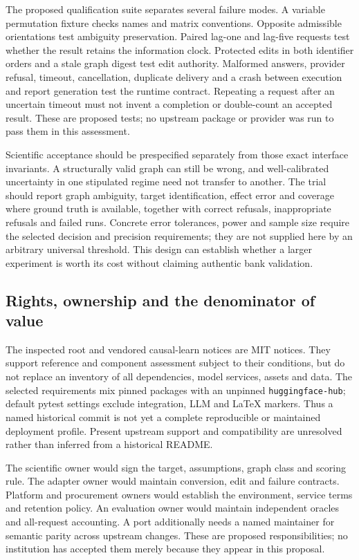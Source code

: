 The proposed qualification suite separates several failure modes. A variable
permutation fixture checks names and matrix conventions. Opposite admissible
orientations test ambiguity preservation. Paired lag-one and lag-five
requests test whether the result retains the information clock. Protected
edits in both identifier orders and a stale graph digest test edit authority.
Malformed answers, provider refusal, timeout, cancellation, duplicate delivery
and a crash between execution and report generation test the runtime
contract. Repeating a request after an uncertain timeout must not invent a
completion or double-count an accepted result. These are proposed tests; no
upstream package or provider was run to pass them in this assessment.
\citep{exec25_copilot_choice}

Scientific acceptance should be prespecified separately from those exact
interface invariants. A structurally valid graph can still be wrong, and
well-calibrated uncertainty in one stipulated regime need not transfer to
another. The trial should report graph ambiguity, target identification,
effect error and coverage where ground truth is available, together with
correct refusals, inappropriate refusals and failed runs. Concrete error
tolerances, power and sample size require the selected decision and precision
requirements; they are not supplied here by an arbitrary universal threshold.
This design can establish whether a larger experiment is worth its cost
without claiming authentic bank validation.~\citep{exec25_copilot_choice}

\subsection{Rights, ownership and the denominator of value}

The inspected root and vendored causal-learn notices are MIT notices. They
support reference and component assessment subject to their conditions, but
do not replace an inventory of all dependencies, model services, assets and
data. The selected requirements mix pinned packages with an unpinned
\texttt{huggingface-hub}; default pytest settings exclude integration, LLM
and LaTeX markers. Thus a named historical commit is not yet a complete
reproducible or maintained deployment profile. Present upstream support and
compatibility are unresolved rather than inferred from a historical README.
\citep{exec17_copilot_code,exec17_copilot_rights}

The scientific owner would sign the target, assumptions, graph class and
scoring rule. The adapter owner would maintain conversion, edit and failure
contracts. Platform and procurement owners would establish the environment,
service terms and retention policy. An evaluation owner would maintain
independent oracles and all-request accounting. A port additionally needs a
named maintainer for semantic parity across upstream changes. These are
proposed responsibilities; no institution has accepted them merely because
they appear in this proposal.~\citep{exec25_copilot_choice}


